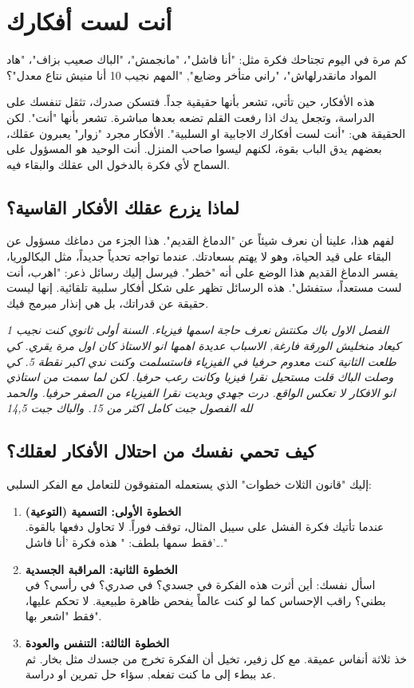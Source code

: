 \documentclass[12pt,a4paper]{book}
\newcommand{\quoteAr}[1]{%
	\begin{myquote}
		\itshape #1
	\end{myquote}
}
\begin{document}
	\section{أنت لست أفكارك}
	\label{sec:you-are-not-fail}
	
	كم مرة في اليوم تجتاحك فكرة مثل: "أنا فاشل"، "مانجمش"، "الباك صعيب بزاف"، "هاد المواد مانقدرلهاش"، "راني متأخر وضايع", "المهم نجيب 10 أنا منيش نتاع معدل"؟
	
	هذه الأفكار، حين تأتي، تشعر بأنها حقيقية جداً. فتسكن صدرك، تثقل تنفسك على الدراسة، وتجعل يدك اذا رفعت القلم تضعه بعدها مباشرة. تشعر بأنها "أنت". لكن الحقيقة هي: "أنت لست أفكارك الاجابية او السلبية". الأفكار مجرد "زوار" يعبرون عقلك، بعضهم يدق الباب بقوة، لكنهم ليسوا صاحب المنزل. أنت الوحيد هو المسؤول على السماح لأي فكرة بالدخول الى عقلك والبقاء فيه. 
	
	\subsection{لماذا يزرع عقلك الأفكار القاسية؟}
	
	لفهم هذا، علينا أن نعرف شيئاً عن "الدماغ القديم". هذا الجزء من دماغك مسؤول عن البقاء على قيد الحياة، وهو لا يهتم بسعادتك. عندما تواجه تحدياً جديداً، مثل البكالوريا، يفسر الدماغ القديم هذا الوضع على أنه "خطر". فيرسل إليك رسائل ذعر: "اهرب، أنت لست مستعداً، ستفشل". هذه الرسائل تظهر على شكل أفكار سلبية تلقائية. إنها ليست حقيقة عن قدراتك، بل هي إنذار مبرمج فيك.

	\quoteAr{الفصل الاول باك مكنتش نعرف حاجة اسمها فيزياء. السنة أولى ثانوي كنت نجيب 1 كيعاد منخليش الورقة فارغة, الاسباب عديدة اهمها انو الاستاذ كان اول مرة يقري. كي طلعت الثانية كنت معدوم حرفيا في الفيزياء فاستسلمت وكنت ندي اكبر نقطة 5. كي وصلت الباك قلت مستحيل نقرا فيزيا وكانت رعب حرفيا. لكن لما سمت من استاذي انو الافكار لا تعكس الواقع. درت جهدي وبديت نقرا الفيزياء من الصفر حرفيا. والحمد لله الفصول جبت كامل اكثر من 15. والباك جبت 14,5}
	\subsection{كيف تحمي نفسك من احتلال الأفكار لعقلك؟}
	
	إليك "قانون الثلاث خطوات" الذي يستعمله المتفوقون للتعامل مع الفكر السلبي:
	
	\begin{enumerate}
		\item \textbf{الخطوة الأولى: التسمية (التوعية)} \\
		عندما تأتيك فكرة الفشل على سيبل المثال، توقف فوراً. لا تحاول دفعها بالقوة. فقط سمها بلطف: " هذه فكرة 'أنا فاشل'..."
		
		\item \textbf{الخطوة الثانية: المراقبة الجسدية} \\
		اسأل نفسك: أين أثرت هذه الفكرة في جسدي؟ في صدري؟ في رأسي؟ في بطني؟ راقب الإحساس كما لو كنت عالماً يفحص ظاهرة طبيعية. لا تحكم عليها، فقط "اشعر بها".
		
		\item \textbf{الخطوة الثالثة: التنفس والعودة} \\
		خذ ثلاثة أنفاس عميقة. مع كل زفير، تخيل أن الفكرة تخرج من جسدك مثل بخار. ثم عد ببطء إلى ما كنت تفعله, سؤاء حل تمرين او دراسة.
	\end{enumerate}
	
\end{document}
